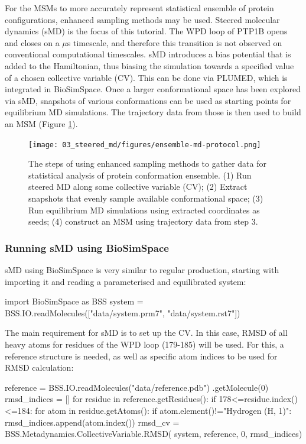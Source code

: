 For the MSMs to more accurately represent statistical ensemble of protein configurations, enhanced sampling methods may be used. Steered molecular dynamics (sMD) is the focus of this tutorial. The WPD loop of PTP1B opens and closes on a $\mu$s timescale,\cite{sMD_Choy-Timescales} and therefore this transition is not observed on conventional computational timescales. sMD introduces a bias potential that is added to the Hamiltonian, thus biasing the simulation towards a specified value of a chosen collective variable (CV). This can be done via PLUMED, which is integrated in BioSimSpace.\cite{sMD_steeredMD,sMD_plumed-2} Once a larger conformational space has been explored via sMD, snapshots of various conformations can be used as starting points for equilibrium MD simulations. The trajectory data from those is then used to build an MSM (Figure \ref{fig:ensemble-protocol}).

\begin{figure}[htp]
\texttt{[image: 03\_steered\_md/figures/ensemble-md-protocol.png]}
\caption{The steps of using enhanced sampling methods to gather data for statistical analysis of protein conformation ensemble. (1) Run steered MD along some collective variable (CV); (2) Extract snapshots that evenly sample available conformational space; (3) Run equilibrium MD simulations using extracted coordinates as seeds; (4) construct an MSM using trajectory data from step 3.}
\label{fig:ensemble-protocol}
\end{figure}

\subsubsection{Running sMD using BioSimSpace}
sMD using BioSimSpace is very similar to regular production, starting with importing it and reading a parameterised and equilibrated system:
\begin{python}
import BioSimSpace as BSS
system = BSS.IO.readMolecules(["data/system.prm7", 
                                "data/system.rst7"])
\end{python}

The main requirement for sMD is to set up the CV. In this case, RMSD of all heavy atoms for residues of the WPD loop (179-185) will be used. For this, a reference structure is needed, as well as specific atom indices to be used for RMSD calculation:
\begin{python}
reference = BSS.IO.readMolecules("data/reference.pdb")
            .getMolecule(0)
rmsd_indices = []
for residue in reference.getResidues():
    if 178<=residue.index()<=184:
        for atom in residue.getAtoms():
            if atom.element()!="Hydrogen (H, 1)":
                rmsd_indices.append(atom.index())
rmsd_cv = BSS.Metadynamics.CollectiveVariable.RMSD(
                system, reference, 0, rmsd_indices)
\end{python}

